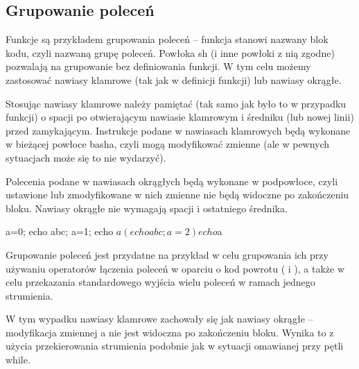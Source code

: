 \subsection{Grupowanie poleceń}

Funkcje są przykładem grupowania poleceń – funkcja stanowi nazwany blok kodu,
czyli nazwaną grupę poleceń. Powłoka sh (i inne powłoki z nią zgodne)
pozwalają na grupowanie bez definiowania funkcji. W tym celu możemy zastosować
nawiasy klamrowe (tak jak w definicji funkcji) lub nawiasy okrągłe.

Stosując nawiasy klamrowe należy pamiętać (tak samo jak było to w przypadku funkcji)
	o spacji po otwierającym nawiasie klamrowym i średniku (lub nowej linii) przed zamykającym.
Instrukcje podane w nawiasach klamrowych będą wykonane w bieżącej powłoce basha,
czyli mogą modyfikować zmienne (ale w pewnych sytuacjach może się to nie wydarzyć).

Polecenia podane w nawiasach okrągłych będą wykonane w podpowłoce,
czyli ustawione lub zmodyfikowane w nich zmienne nie będą widoczne po zakończeniu bloku.
Nawiasy okrągłe nie wymagają spacji i ostatniego średnika.

\begin{CodeFrame*}[bash]{}
a=0;
{ echo abc; a=1; }
echo $a
(echo abc; a=2)
echo $a
\end{CodeFrame*}

Grupowanie poleceń jest przydatne na przykład w celu grupowania ich przy używaniu operatorów
łączenia poleceń w oparciu o kod powrotu (\shell{&&} i \shell{||}),
a także w celu przekazania standardowego wyjścia wielu poleceń w ramach jednego strumienia.


W tym wypadku nawiasy klamrowe zachowały się jak nawiasy okrągłe – modyfikacja
zmiennej a nie jest widoczna po zakończeniu bloku.
Wynika to z użycia przekierowania strumienia podobnie jak w sytuacji omawianej przy pętli while.

